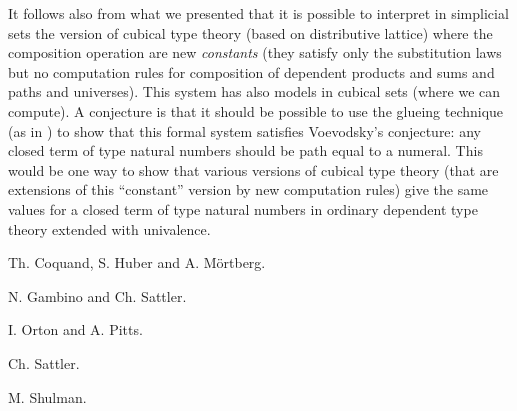 \documentclass[10pt,a4paper]{article}
\begin{document}
 It follows also from what we presented that it is possible to interpret in simplicial
sets the version of cubical type theory (based on distributive lattice) where 
the composition operation are new {\em constants} (they satisfy only the substitution laws
but no computation rules for composition of dependent products and sums and paths and
universes). This system has also models in cubical sets (where we can compute).
A conjecture is that it should be possible to use the glueing technique
(as in \cite{Shulman}) to show that this formal system satisfies Voevodsky's conjecture: any
closed term of type natural numbers should be path equal to a numeral.
This would be one way to show that various versions of cubical type theory (that are extensions
of this ``constant'' version by new computation rules) give the same values for a closed
term of type natural numbers in ordinary dependent type theory extended with univalence.

\begin{thebibliography}{9}

Th. Coquand, S. Huber and A. M\"ortberg.

N. Gambino and Ch. Sattler.

I. Orton and A. Pitts.


Ch. Sattler.

M. Shulman.

\end{thebibliography}
\end{document}
